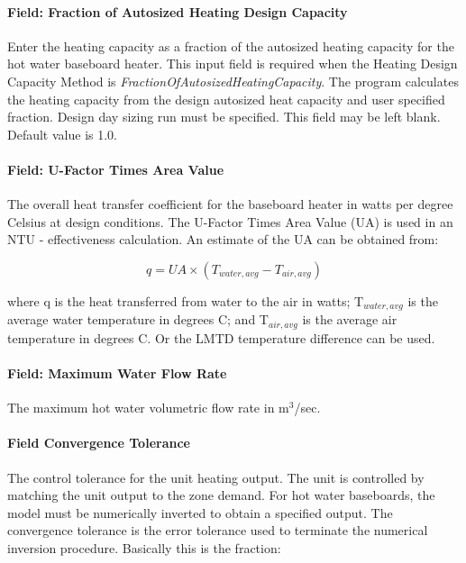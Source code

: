 \paragraph{Field: Fraction of Autosized Heating Design Capacity}\label{field-fraction-of-autosized-heating-design-capacity-3}

Enter the heating capacity as a fraction of the autosized heating capacity for the hot water baseboard heater. This input field is required when the Heating Design Capacity Method is \emph{FractionOfAutosizedHeatingCapacity}. The program calculates the heating capacity from the design autosized heat capacity and user specified fraction. Design day sizing run must be specified. This field may be left blank. Default value is 1.0.

\paragraph{Field: U-Factor Times Area Value}\label{field-u-factor-times-area-value-000}

The overall heat transfer coefficient for the baseboard heater in watts per degree Celsius at design conditions. The U-Factor Times Area Value (UA) is used in an NTU - effectiveness calculation. An estimate of the UA can be obtained from:

\begin{equation}
q = UA \times ({T_{water,avg}} - {T_{air,avg}})
\end{equation}

where q is the heat transferred from water to the air in watts; T\(_{water, avg}\) is the average water temperature in degrees C; and T\(_{air, avg}\) is the average air temperature in degrees C. Or the LMTD temperature difference can be used.

\paragraph{Field: Maximum Water Flow Rate}\label{field-maximum-water-flow-rate-1-000}

The maximum hot water volumetric flow rate in m\(^{3}\)/sec.

\paragraph{Field Convergence Tolerance}\label{field-convergence-tolerance-2-000}

The control tolerance for the unit heating output. The unit is controlled by matching the unit output to the zone demand. For hot water baseboards, the model must be numerically inverted to obtain a specified output. The convergence tolerance is the error tolerance used to terminate the numerical inversion procedure. Basically this is the fraction:


